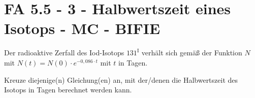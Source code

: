 \section{FA 5.5 - 3 - Halbwertszeit eines Isotops - MC - BIFIE}

\begin{beispiel}[FA 5.5]{1} %
Der radioaktive Zerfall des Iod-Isotops ${131}^\text{I}$ verhält sich gemäß der Funktion $N$ mit $N(t)=N(0)\cdot e^{-0,086\cdot t}$ mit $t$ in Tagen. 

\leer

Kreuze diejenige(n) Gleichung(en) an, mit der/denen die Halbwertszeit des Isotops in Tagen berechnet werden kann.

\end{beispiel}